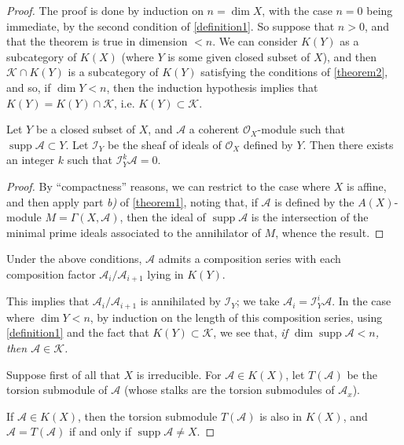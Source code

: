 \documentclass{article}
\theoremstyle{plain}
\newenvironment{lemma}[1]
    {\renewcommand\theinnercustomlemma{#1}\innercustomlemma}
    {\endinnercustomlemma}
\newenvironment{corollary}[1]
    {\renewcommand\theinnercustomcorollary{#1}\innercustomcorollary}
    {\endinnercustomcorollary}
\theoremstyle{definition}
\newcommand{\sh}{\mathscr}
\newcommand{\cat}{\mathcal}
\newcommand{\supp}{\operatorname{supp}}
\newcommand{\oldpage}[1]{\marginpar{\footnotesize$\Big\vert$ \textit{p.~#1}}}
\begin{document}
\begin{proof}
  The proof is done by induction on $n=\dim X$, with the case $n=0$ being immediate, by the second condition of \cref{definition1}.
  So suppose that $n>0$, and that the theorem is true in dimension $<n$.
  We can consider $K(Y)$ as a subcategory of $K(X)$ (where $Y$ is some given closed subset of $X$), and then $\cat{K}\cap K(Y)$ is a subcategory of $K(Y)$ satisfying the conditions of \cref{theorem2}, and so, if $\dim Y<n$, then the induction hypothesis implies that $K(Y)=K(Y)\cap\cat{K}$, i.e. $K(Y)\subset\cat{K}$.

  \begin{lemma}{1}
  \label{lemma1}
    Let $Y$ be a closed subset of $X$, and $\sh{A}$ a coherent $\sh{O}_X$-module such that $\supp\sh{A}\subset Y$.
    Let $\sh{I}_Y$ be the sheaf of ideals of $\sh{O}_X$ defined by $Y$.
    Then there exists an integer $k$ such that $\sh{I}_Y^k\sh{A}=0$.
  \end{lemma}

  \begin{proof}
    By ``compactness'' reasons, we can restrict to the case where $X$ is affine, and then apply part \emph{b)} of \cref{theorem1}, noting that, if $\sh{A}$ is defined by the $A(X)$-module $M=\Gamma(X,\sh{A})$, then the ideal of $\supp\sh{A}$ is the intersection of the minimal prime ideals associated to the annihilator of $M$, whence the result.
  \end{proof}

  \begin{corollary}{\!\!}
  \label{corollary-1}
    Under the above conditions, $\sh{A}$ admits a composition series with each composition factor $\sh{A}_i/\sh{A}_{i+1}$ lying in $K(Y)$.
  \end{corollary}

  This implies that $\sh{A}_i/\sh{A}_{i+1}$ is annihilated by $\sh{I}_Y$;
  we take $\sh{A}_i=\sh{I}_Y^i\sh{A}$.
  In the case where $\dim Y<n$, by induction on the length of
  \oldpage{2-03}
  this composition series, using \cref{definition1} and the fact that $K(Y)\subset\cat{K}$, we see that, \emph{if $\dim\supp\sh{A}<n$, then $\sh{A}\in\cat{K}$.}

  Suppose first of all that $X$ is irreducible.
  For $\sh{A}\in K(X)$, let $T(\sh{A})$ be the torsion submodule of $\sh{A}$ (whose stalks are the torsion submodules of $\sh{A}_x$).

  \begin{lemma}{2}
  \label{lemma2}
    If $\sh{A}\in K(X)$, then the torsion submodule $T(\sh{A})$ is also in $K(X)$, and $\sh{A}=T(\sh{A})$ if and only if $\supp\sh{A}\neq X$.
  \end{lemma}


\end{proof}
\end{document}
